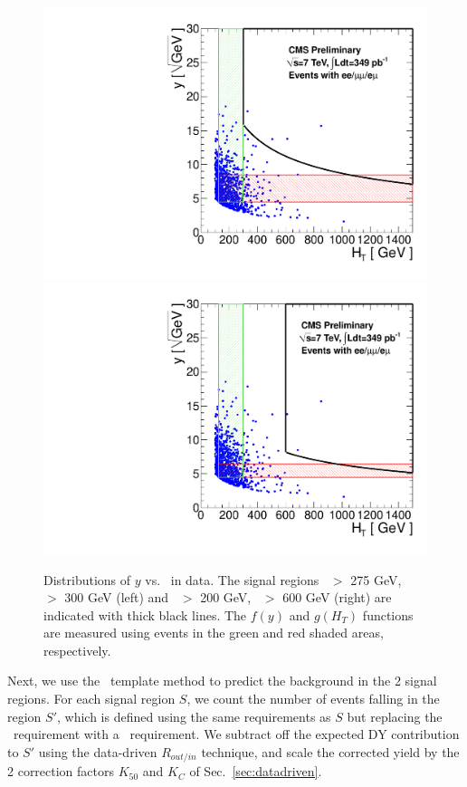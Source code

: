 \begin{figure}[hbt]
\begin{center}
\includegraphics[width=0.48\linewidth]{plots_final/abcdprime_349pb_highmet.pdf}
\includegraphics[width=0.48\linewidth]{plots_final/abcdprime_349pb_highht.pdf}
\caption{\label{fig:abcdprimedata}\protect 
Distributions of $y$ vs. \Ht\ in data. The signal regions \met\ $>$ 275 GeV, \Ht\ $>$ 300 GeV (left)
and \met\ $>$ 200 GeV, \Ht\ $>$ 600 GeV (right) are indicated with thick black lines. 
The $f(y)$ and $g(H_T)$ 
functions are measured using events in the green and red shaded areas, respectively.
}
\end{center}
\end{figure}

Next, we use the \ptll\ template method to predict the background in the 2 signal regions.
For each signal region $S$, we count the number of events falling in the region $S'$, which is 
defined using the same requirements as $S$ but replacing the \MET\ requirement with a \ptll\
requirement. We subtract off the expected DY contribution to $S'$ using the data-driven $R_{out/in}$
technique, and scale the corrected yield by the 2 correction factors $K_{50}$ and $K_C$ of Sec.~\ref{sec:datadriven}.



